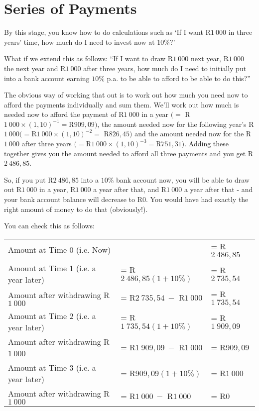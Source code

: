 \section{Series of Payments}

By this stage, you know how to do calculations such as `If I want R$1~000$ in three years' time, how much do I need to invest now at $10\%$?'

What if we extend this as follows: ``If I want to draw R$1~000$ next year, R$1~000$ the next year and R$1~000$ after three years, how much do I need to initially put into a bank account earning $10\%$ p.a.\@{} to be able to afford to be able to do this?''

The obvious way of working that out is to work out how much you need now to afford the payments individually and sum them. We'll work out how much is needed now to afford the payment of R$1~000$ in a year $(= $ {R}$1~000\times (1,10)^{-1} = ${R}$909,09)$, the amount needed now for the following year's R$1~000 (= ${R}$1~000\times (1,10)^{-2} = $ {R}$826,45)$ and the amount needed now for the R$1~000$ after three years $(= ${R}$1~000\times (1,10)^{-3} =${R}$751,31)$. Adding these together gives you the amount needed to afford all three payments and you get R$2~486,85$.

So, if you put R$2~486,85$ into a $10\%$ bank account now, you will be able to draw out R$1~000$ in a year, R$1~000$ a year after that, and R$1~000$ a year after that - and your bank account balance will decrease to R$0$. You would have had exactly the right amount of money to do that (obviously!).

You can check this as follows:

\begin{tabular}{lll}
Amount at Time 0 (i.e.\@{} Now) &&= R$2~486,85$\\
Amount at Time 1 (i.e.\@{} a year later) &= R$2~486,85(1+10\%)$ &= R$2~735,54$\\
Amount after withdrawing R$1~000$ &= R$2~735,54 ~-$ R$1~000$ &= R$1~735,54$\\
Amount at Time 2 (i.e.\@{} a year later) &= R$1~735,54(1+10\%)$ &= R$1~909,09$\\
Amount after withdrawing R$1~00$0 &= R$1~909,09 ~-$ R$1~000$ &= R$909,09$\\
Amount at Time 3 (i.e.\@{} a year later) &= R$909,09(1+10\%)$ &= R$1~000$\\
Amount after withdrawing R$1~000$ &= R$1~000 ~-$ R$1~000$ &= R$0$\\
\end{tabular}

